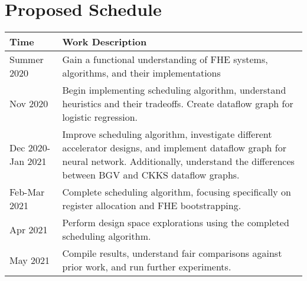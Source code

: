 \section{Proposed Schedule}

\begin{table}[h]
\centering
\begin{tabular}{l p{}}
\toprule[1.5pt]
Time & Work Description \\
\hline
Summer 2020 & Gain a functional understanding of FHE systems, algorithms, and
 their implementations\\
Nov 2020 & Begin implementing scheduling algorithm, understand heuristics and their tradeoffs. Create dataflow graph for logistic regression.\\
Dec 2020-Jan 2021 & Improve scheduling algorithm, investigate different accelerator designs, and implement dataflow graph for neural network. Additionally, understand the differences between BGV and CKKS dataflow graphs.\\
Feb-Mar 2021 & Complete scheduling algorithm, focusing specifically on register allocation and FHE bootstrapping.\\
Apr 2021 & Perform design space explorations using the completed scheduling algorithm.\\
May 2021 & Compile results, understand fair comparisons against prior work, and run further experiments.\\
\bottomrule[1.5pt]
\end{tabular}
\end{table}
